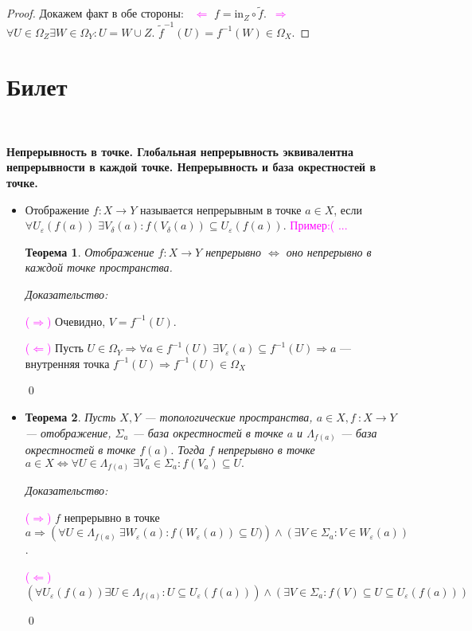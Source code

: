 \documentclass[a4paper,100pt]{article}
\theoremstyle{indented}
\newtheorem{theorem}{Теорема}
\begin{document}
\begin{proof}
    Докажем факт в обе стороны: \
    \textcolor{magenta}{$\Leftarrow$} $f=\text{in}_Z\circ \tilde{f}$.\
    \textcolor{magenta}{$\Rightarrow$} $\forall U \in \Omega_Z \exists W \in \Omega_Y : U=W\cup Z$. $\tilde{f}^{-1}(U) = f^{-1}(W)\in \Omega_X$.
\end{proof}

\section{Билет} \

\textbf{Непрерывность в точке. Глобальная непрерывность эквивалентна непрерывности в каждой точке. Непрерывность и база окрестностей в точке.}
    \begin{itemize}
        \item Отображение $f: X \rightarrow Y$ называется непрерывным в точке $a \in X$, если
        $\forall U_\varepsilon (f(a)) \; \exists V_\delta (a) : f(V_\delta (a)) \subseteq U_\varepsilon (f(a))$.
        \textcolor{magenta}{Пример:( ...}
        \begin{theorem}
            Отображение $f: X \rightarrow Y$ непрерывно $\iff$ оно непрерывно в каждой точке пространства.
        \end{theorem}
        \textit{Доказательство:}
    
            \textcolor{magenta}{($\Rightarrow$)} Очевидно, $V = f^{-1} (U).$
        
            \textcolor{magenta}{($\Leftarrow$)}
            Пусть $U \in \Omega_Y \Rightarrow \forall a \in f^{-1}(U) \; \exists V_{\varepsilon}(a) 
            \subseteq f^{-1}(U) \Rightarrow a$ --- внутренняя точка $f^{-1}(U) \Rightarrow f^{-1}(U) \in \Omega_X$
            
            \qed
            
            \item 
            \begin{theorem}
                Пусть $X, Y$ --- топологические пространства, $a \in X, f~{: X \rightarrow Y}$ --- отображение, $\Sigma_a$ --- база окрестностей в точке $a$ и $\Lambda_{f(a)}$ --- база окрестностей в точке $f(a)$. Тогда $f$ непрерывно в точке $a \in X \iff \forall U \in \Lambda_{f(a)} \; \exists V_a \in \Sigma_a : f(V_a) \subseteq U.$
            \end{theorem}
            
            \textit{Доказательство:} 
            
            \textcolor{magenta}{($\Rightarrow$)} $f$ непрерывно в точке $a \Rightarrow \left( \forall U \in \Lambda_{f(a)} \: \exists W_\varepsilon(a): f(W_\varepsilon(a)) \subseteq U) \right) \wedge \left( \exists V \in \Sigma_a: V \in W_\varepsilon(a)\right)$.
            
            \textcolor{magenta}{($\Leftarrow$)} $\left(\forall U_\varepsilon(f(a)) \exists U \in \Lambda_{f(a)}: U \subseteq U_\varepsilon(f(a))\right)\wedge\left(\exists V \in \Sigma_a : f(V) \subseteq U \subseteq U_\varepsilon(f(a))\right) $
            
            \qed
    \end{itemize}
\end{document}
